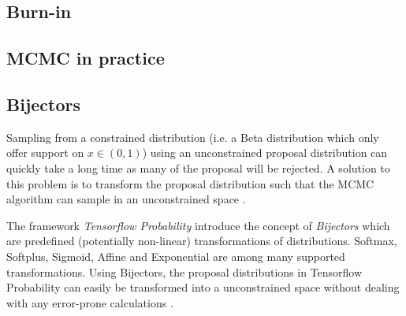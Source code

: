 \subsection{Burn-in}

\subsection{MCMC in practice}

\subsection{Bijectors}
Sampling from a constrained distribution (i.e. a Beta distribution which only offer support on $x \in (0, 1)$) using an unconstrained proposal distribution can quickly take a long time as many of the proposal will be rejected. A solution to this problem is to transform the proposal distribution such that the MCMC algorithm can sample in an unconstrained space \cite{Parno_2018, tensorflow2015-whitepaper}. 

The framework \textit{Tensorflow Probability} introduce the concept of \textit{Bijectors} which are predefined (potentially non-linear) transformations of distributions. Softmax, Softplus, Sigmoid, Affine and Exponential are among many supported transformations. Using Bijectors, the proposal distributions in Tensorflow Probability can easily be transformed into a unconstrained space without dealing with any error-prone calculations \cite{tensorflow2015-whitepaper}. 



